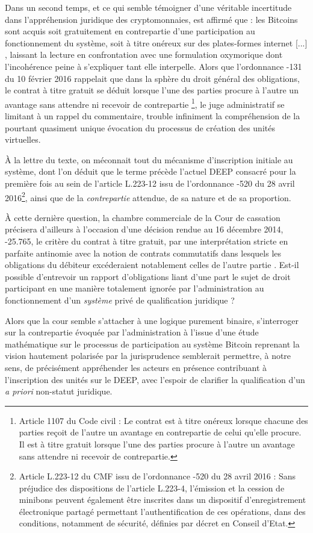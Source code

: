 {Dans un second temps, et ce qui semble témoigner d'une véritable incertitude dans l'appréhension juridique des cryptomonnaies, est affirmé que : \og les Bitcoins sont acquis soit gratuitement en contrepartie d'une participation au fonctionnement du système, soit à titre onéreux sur des plates-formes internet [...] \fg, laissant la lecture en confrontation avec une formulation oxymorique dont l'incohérence peine à s'expliquer tant elle interpelle. Alors que l'ordonnance -131 du 10 février 2016 rappelait que dans la sphère du droit général des obligations, le contrat à titre gratuit se déduit \og lorsque l'une des parties procure à l'autre un avantage sans attendre ni recevoir de contrepartie \fg{}\footnote{Article 1107 du Code civil : \og Le contrat est à titre onéreux lorsque chacune des parties reçoit de l'autre un avantage en contrepartie de celui qu'elle procure. Il est à titre gratuit lorsque l'une des parties procure à l'autre un avantage sans attendre ni recevoir de contrepartie\fg{}.}, le juge administratif se limitant à un rappel du commentaire, trouble infiniment la compréhension de la pourtant quasiment unique évocation du processus de création des unités virtuelles.\par
À la lettre du texte, on méconnait tout du mécanisme d'inscription initiale au \og système\fg{}, dont l'on déduit que le terme précède l'actuel \og DEEP\fg{} consacré pour la première fois au sein de l'article L.223-12 issu de l'ordonnance -520 du 28 avril 2016\footnote{Article L.223-12 du CMF issu de l'ordonnance -520 du 28 avril 2016 : \og Sans préjudice des dispositions de l'article L.223-4, l'émission et la cession de minibons peuvent également être inscrites dans un dispositif d'enregistrement électronique partagé permettant l'authentification de ces opérations, dans des conditions, notamment de sécurité, définies par décret en Conseil d'Etat\fg.}, ainsi que de la \emph{contrepartie} attendue, de sa nature et de sa proportion.\par
À cette dernière question, la chambre commerciale de la Cour de cassation précisera d'ailleurs à l'occasion d'une décision rendue au 16 décembre 2014, -25.765, le critère du contrat à titre gratuit, par une interprétation stricte en parfaite antinomie avec la notion de contrats commutatifs \og dans lesquels les obligations du débiteur\fg{} excéderaient \og notablement celles de l'autre partie \fg{}. Est-il possible d'entrevoir un rapport d'obligations liant d'une part le sujet de droit participant \textemdash{} en une manière totalement ignorée par l'administration \textemdash{} au fonctionnement d'un \emph{système} privé de qualification juridique ?\par 
Alors que la cour semble s'attacher à une logique purement binaire, s'interroger sur la contrepartie évoquée par l'administration à l'issue d'une étude mathématique sur le processus de participation au système Bitcoin \textemdash{} reprenant la vision hautement polarisée par la jurisprudence \textemdash{} semblerait permettre, à notre sens, de précisément appréhender les acteurs en présence contribuant à l'inscription des unités sur le DEEP, avec l'espoir de clarifier la qualification d'un \emph{a priori} non-statut juridique.\par

}
